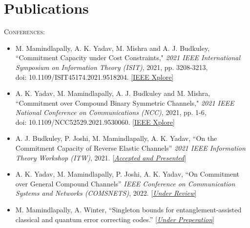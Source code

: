 \documentclass[a4paper,10pt]{article}
\def \siteurl{https://manideepmamindlapally.ninja}
\begin{document}
\section{Publications}
\vspace{0.2cm}
\begin{flushleft}
\begin{flushleft}
	\textsc{Conferences}:	
	\begin{itemize}
		\item M. Mamindlapally, A. K. Yadav, M. Mishra and A. J. Budkuley, ``Commitment Capacity under Cost Constraints," \textit{2021 IEEE International Symposium on Information Theory (ISIT)}, 2021, pp. 3208-3213, \\ doi: 10.1109/ISIT45174.2021.9518204.
		\href{https://doi.org/10.1109/ISIT45174.2021.9518204}{\small{[IEEE Xplore]}}
		
		\item A. K. Yadav, M. Mamindlapally, A. J. Budkuley and M. Mishra, ``Commitment over Compound Binary Symmetric Channels," \textit{2021 IEEE National Conference on Communications (NCC)}, 2021, pp. 1-6, \\ doi: 10.1109/NCC52529.2021.9530060. \href{https://doi.org/10.1109/NCC52529.2021.9530060}{\small{[IEEE Xplore]}}
		
		\item A. J. Budkuley, P. Joshi, M. Mamindlapally, A. K. Yadav, ``On the Commitment Capacity of Reverse Elastic Channels'' \textit{2021 IEEE Information Theory Workshop (ITW)}, 2021. \href{https://www.itsoc.org/event/itw-2021-kanazawa}{\small{[\textit{Accepted and Presented}]}}
		
		\item A. K. Yadav, M. Mamindlapally, P. Joshi, A. K. Yadav, ``On Commitment over General Compound Channels'' \textit{IEEE Conference on Communication Systems and Networks (COMSNETS)}, 2022. \href{https://www.comsnets.org/}{\small{[\textit{Under Review}]}}
		
		\item M. Mamindlapally, A. Winter, ``Singleton bounds for entanglement-assisted classical and quantum error correcting codes.'' \href{\siteurl /assests/files/cv/cv.pdf}{\small{[\textit{Under Preperation}]}}
	\end{itemize}
\end{flushleft}


\end{flushleft}
\end{document}
